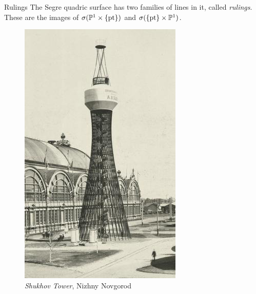 \begin{frame}
    \begin{block}{Rulings}
    The Segre quadric surface has two families of lines in it, called \emph{rulings}. These are the images of $\sigma(\mathbb{P}^{1} \times \{ \text{pt} \} )$ and $\sigma( \{ \text{pt} \} \times \mathbb{P}^{1})$.
    \end{block}

    \begin{figure}[!htb]
    \centering
    \begin{minipage}{0.3\textwidth}
        \centering
        \includegraphics[height=0.5\textheight]{resources/shukhov-1.jpg}
        \caption{\emph{Shukhov Tower}, Nizhny Novgorod}
    \end{minipage}%
    \begin{minipage}{0.3\textwidth}
        \centering

\end{minipage}
\end{figure}
\end{frame}
